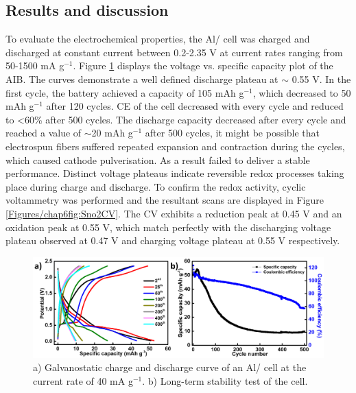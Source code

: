 \subsection{Results and discussion}
To evaluate the electrochemical properties, the Al/ cell was charged and discharged at constant current between 0.2-2.35 V at current rates ranging from 50-1500 mA g$^{-1}$. Figure \ref{Figures/chap6fig:SnO2newCDC} displays the voltage vs. specific capacity plot of the AIB. The curves demonstrate a well defined discharge plateau at $\sim$ 0.55 V. In the first cycle, the battery achieved a capacity of 105 mAh g$^{-1}$, which decreased to 50 mAh g$^{-1}$ after 120 cycles. CE of the cell decreased with every cycle and reduced to <60\% after 500 cycles. The discharge capacity decreased after every cycle and reached a value of $\sim$20 mAh g$^{-1}$ after 500 cycles, it might be possible that electrospun fibers suffered repeated expansion and contraction during the cycles, which caused cathode pulverisation. As a result  failed to deliver a stable performance. Distinct voltage plateaus indicate reversible redox processes taking place during charge and discharge. To confirm the redox activity, cyclic voltammetry was performed and the resultant scans are displayed in Figure \ref{Figures/chap6fig:Sno2CV}. The CV exhibits a reduction peak at 0.45 V and an oxidation peak at 0.55 V, which match perfectly with the discharging voltage plateau observed at 0.47 V and charging voltage plateau at 0.55 V respectively.    

 \begin{figure}[th!]
  \centering
  \includegraphics[width=\textwidth]{Figures/chap6fig/SnO2newCDC}
    \caption{a) Galvanostatic charge and discharge curve of an Al/ cell at the current rate of 40 mA g$^{-1}$. b) Long-term stability test of the cell.}
  \label{Figures/chap6fig:SnO2newCDC}
\end{figure}

